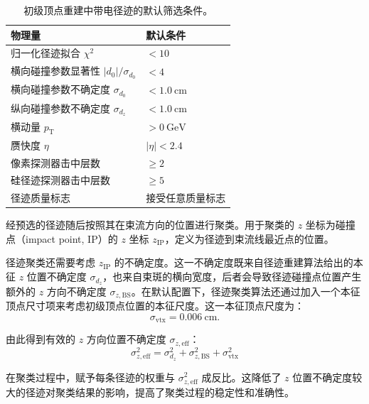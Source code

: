 \begin{table}
  \centering
  \begin{threeparttable}[c]
    \caption{初级顶点重建中带电径迹的默认筛选条件。}
    \label{tab:pv-reco-track-selection}
    \begin{tabular}{ll}
      \toprule
      物理量 & 默认条件 \\
      \midrule
      归一化径迹拟合 $\chi^2$ & $< 10$ \\
      横向碰撞参数显著性 $|d_0|/\sigma_{d_0}$ & $< 4$ \\
      横向碰撞参数不确定度 $\sigma_{d_0}$ & $< \SI{1.0}{\centi\meter}$ \\
      纵向碰撞参数不确定度 $\sigma_{d_z}$ & $< \SI{1.0}{\centi\meter}$ \\
      横动量 $p_{\mathrm{T}}$ & $> \SI{0}{\giga\eV}$ \\
      赝快度 $\eta$ & $|\eta| < 2.4$ \\
      像素探测器击中层数 & $\ge 2$ \\
      硅径迹探测器击中层数 & $\ge 5$ \\
      径迹质量标志 & 接受任意质量标志 \\
      \bottomrule
    \end{tabular}
  \end{threeparttable}
\end{table}

经预选的径迹随后按照其在束流方向的位置进行聚类。用于聚类的 $z$ 坐标为碰撞点（impact point, IP）的 $z$ 坐标 $z_{\mathrm{IP}}$，定义为径迹到束流线最近点的位置。

径迹聚类还需要考虑 $z_{\mathrm{IP}}$ 的不确定度。这一不确定度既来自径迹重建算法给出的本征 $z$ 位置不确定度 $\sigma_{d_z}$，也来自束斑的横向宽度，后者会导致径迹碰撞点位置产生额外的 $z$ 方向不确定度 $\sigma_{z,\mathrm{BS}}$。在默认配置下，径迹聚类算法还通过加入一个本征顶点尺寸项来考虑初级顶点位置的本征尺度。这一本征顶点尺度为：
\begin{equation}
\label{eq:vtx-resolution}
  \sigma_{\mathrm{vtx}} = \SI{0.006}{\centi\meter}.
\end{equation}

由此得到有效的 $z$ 方向位置不确定度 $\sigma_{z,\mathrm{eff}}$：
\begin{equation}
\label{eq:z-resolution}
  \sigma_{z,\mathrm{eff}}^2
  =
  \sigma_{d_z}^2
  + \sigma_{z,\mathrm{BS}}^2
  + \sigma_{\mathrm{vtx}}^2
\end{equation}

在聚类过程中，赋予每条径迹的权重与 $\sigma_{z,\mathrm{eff}}^2$ 成反比。这降低了 $z$ 位置不确定度较大的径迹对聚类结果的影响，提高了聚类过程的稳定性和准确性。

